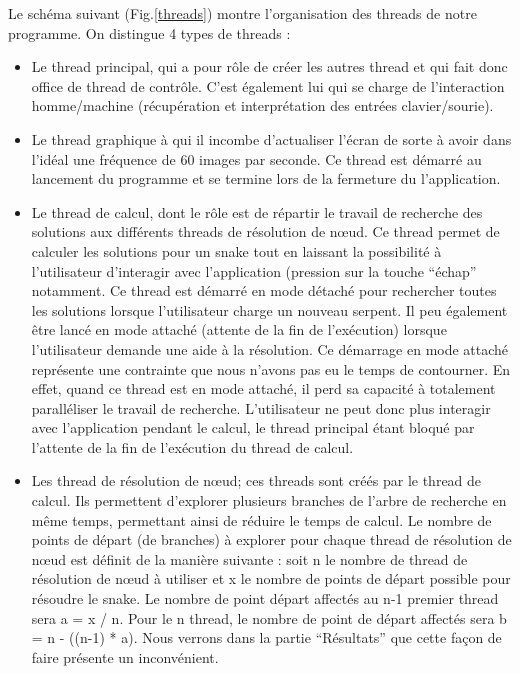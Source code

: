 Le schéma suivant (Fig.\ref{threads}) montre l'organisation des threads de notre programme. On distingue 4 types de threads :
\begin{itemize}
 \item Le thread principal, qui a pour rôle de créer les autres thread et qui fait donc office de thread de contrôle. C'est également lui qui se charge de l’interaction homme/machine (récupération et interprétation des entrées clavier/sourie).
 \item Le thread graphique à qui il incombe d'actualiser l'écran de sorte à avoir dans l'idéal une fréquence de 60 images par seconde. Ce thread est démarré au lancement du programme et se termine lors de la fermeture du l'application.
 \item Le thread de calcul, dont le rôle est de répartir le travail de recherche des solutions aux différents threads de résolution de nœud. Ce thread permet de calculer les solutions pour un snake tout en laissant la possibilité à l'utilisateur d'interagir avec l'application (pression sur la touche ``échap'' notamment. Ce thread est démarré en mode détaché pour rechercher toutes les solutions lorsque l'utilisateur charge un nouveau serpent. Il peu également être lancé en mode attaché (attente de la fin de l’exécution) lorsque l'utilisateur demande une aide à la résolution. Ce démarrage en mode attaché représente une contrainte que nous n'avons pas eu le temps de contourner. En effet, quand ce thread est en mode attaché, il perd sa capacité à totalement paralléliser le travail de recherche. L'utilisateur ne peut donc plus interagir avec l'application pendant le calcul, le thread principal étant bloqué par l'attente de la fin de l'exécution du thread de calcul.
 \item Les thread de résolution de nœud; ces threads sont créés par le thread de calcul. Ils permettent d'explorer plusieurs branches de l'arbre de recherche en même temps, permettant ainsi de réduire le temps de calcul. Le nombre de points de départ (de branches) à explorer pour chaque thread de résolution de nœud est définit de la manière suivante : soit n le nombre de thread de résolution de nœud à utiliser et x le nombre de points de départ possible pour résoudre le snake. Le nombre de point départ affectés au n-1 premier thread sera a = x / n. Pour le n thread, le nombre de point de départ affectés sera b = n - ((n-1) * a). Nous verrons dans la partie ``Résultats'' que cette façon de faire présente un inconvénient.
\end{itemize}

